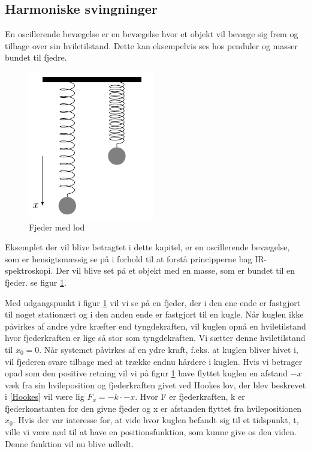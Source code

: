 \subsection{Harmoniske svingninger}\label{teori: Harmoniske svingninger}
En oscillerende bevægelse er en bevægelse hvor et objekt vil bevæge sig frem og tilbage over sin hviletilstand. Dette kan eksempelvis ses hos penduler og masser bundet til fjedre.
\\

\begin{figure}
\centering
\includegraphics[scale=1]{Billeder/fjeder}
\caption{Fjeder med lod \label{fig:fjeder}}
\end{figure} 

Eksemplet der vil blive betragtet i dette kapitel, er en oscillerende bevægelse, som er hensigtsmæssig se på i forhold til at forstå principperne bag IR-spektroskopi. Der  vil blive set på et objekt med en masse, som er bundet til en fjeder. se figur \ref{fig:fjeder}.

Med udgangspunkt i figur \ref{fig:fjeder} vil vi se på en fjeder, der i den ene ende er fastgjort til noget stationært og i den anden ende er fastgjort til en kugle. Når kuglen ikke påvirkes af andre ydre kræfter end tyngdekraften, vil kuglen opnå en hviletilstand hvor fjederkraften er lige så stor som tyngdekraften. Vi sætter denne hviletilstand til $x_0=0$. Når systemet påvirkes af en ydre kraft, f.eks. at kuglen bliver hivet i, vil fjederen svare tilbage med at trække endnu hårdere i kuglen. Hvis vi betrager opad som den positive retning vil vi på figur \ref{fig:fjeder} have flyttet kuglen en afstand $-x$ væk fra sin hvileposition og fjederkraften givet ved Hookes lov, der blev beskrevet i \ref{Hookes} vil være lig $F_x=-k \cdot -x$. Hvor F er fjederkraften, k er fjederkonstanten for den givne fjeder og x er afstanden flyttet fra hvilepositionen $x_0$. Hvis der var interesse for, at vide hvor kuglen befandt sig til et tidspunkt, t, ville vi være nød til at have en positionsfunktion, som kunne give os den viden. Denne funktion vil nu blive udledt.